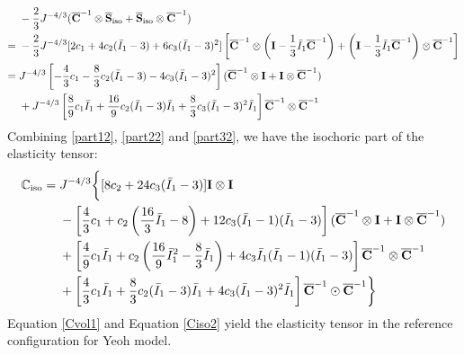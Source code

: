 \begin{equation} \label{part32}
\begin{split}
&-\frac{2}{3}J^{-4/3}({\overline{\bold{C}}}^{-1} \otimes {\overline{\bold{S}}}_\mathrm{iso} + {\overline{\bold{S}}}_\mathrm{iso} \otimes {\overline{{\bold{C}}}^{-1}})\\
= {} &
-\frac{2}{3}J^{-4/3}[2c_1 + 4c_2({\bar{I}}_1 - 3) + 6c_3({\bar{I}}_1 - 3)^2]
\left[{\overline{\bold{C}}}^{-1} \otimes \left(\bold{I} - \frac{1}{3}{\bar{I}_1}{\overline{\bold{C}}}^{-1}\right) + 
\left(\bold{I} - \frac{1}{3}{\bar{I}_1}{\overline{\bold{C}}}^{-1}\right) \otimes {\overline{\bold{C}}}^{-1}\right]\\
= {} &
J^{-4/3}  \left[-\frac{4}{3}c_1 - \frac{8}{3}c_2({\bar{I}}_1 - 3) - 4c_3({\bar{I}}_1 - 3)^2\right] ({\overline{\bold{C}}}^{-1} \otimes \bold{I} + \bold{I} \otimes {\overline{\bold{C}}}^{-1}) \\
&+ J^{-4/3}  \left[\frac{8}{9}c_1{\bar{I}}_1 + \frac{16}{9}c_2({\bar{I}}_1 - 3){\bar{I}}_1 + \frac{8}{3}c_3({\bar{I}}_1 - 3)^2{\bar{I}}_1 \right] {\overline{\bold{C}}}^{-1} \otimes {\overline{\bold{C}}}^{-1}
\end{split}
\end{equation}
Combining \ref{part12}, \ref{part22} and \ref{part32}, we have the isochoric part of the elasticity tensor:
\begin{equation} \label{Ciso2}
\begin{split}
{\mathbb{C}}_\mathrm{iso} = {} & J^{-4/3} \bigg\{
[8c_2+24c_3({\bar{I}}_1 - 3)] \bold{I} \otimes \bold{I} \\
&- \left[\frac{4}{3}c_1 + c_2\left(\frac{16}{3}{\bar{I}}_1 - 8\right) + 12c_3({\bar{I}}_1 - 1)({\bar{I}}_1 - 3)\right]({\overline{\bold{C}}}^{-1} \otimes \bold{I} + \bold{I} \otimes {\overline{\bold{C}}}^{-1})\\
&+ \left[\frac{4}{9}c_1{\bar{I}}_1 + c_2\left(\frac{16}{9}{{\bar{I}}_1}^2 - \frac{8}{3}{\bar{I}}_1\right) + 4c_3{\bar{I}}_1({\bar{I}}_1 - 1)({\bar{I}}_1 - 3)\right] {\overline{\bold{C}}}^{-1} \otimes {\overline{\bold{C}}}^{-1} \\
&+ \left[\frac{4}{3}c_1{\bar{I}}_1 + \frac{8}{3}c_2({\bar{I}}_1 - 3){\bar{I}}_1 + 4c_3({\bar{I}}_1 - 3)^2{\bar{I}}_1\right]{\overline{\bold{C}}}^{-1} \odot {\overline{\bold{C}}}^{-1}
\bigg\}
\end{split}
\end{equation}
Equation \ref{Cvol1} and Equation \ref{Ciso2} yield the elasticity tensor in the reference configuration for Yeoh model.

